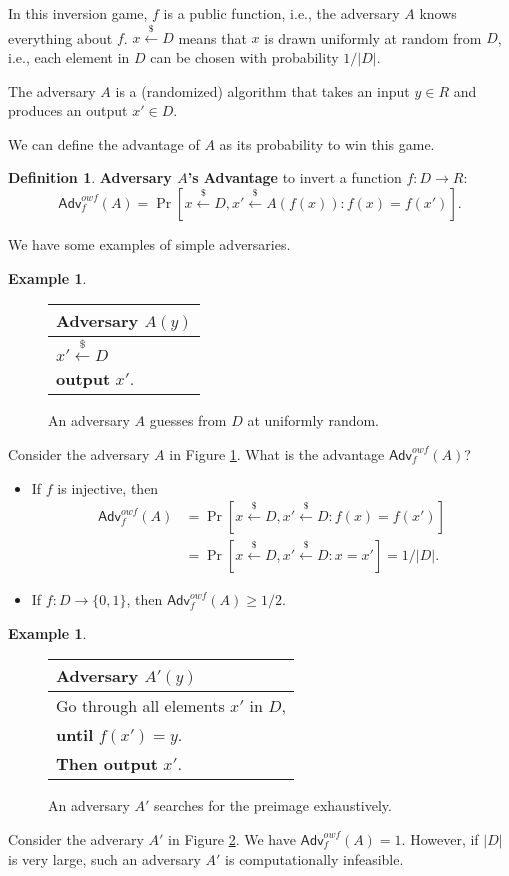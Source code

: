\documentclass[12pt]{article}
\newcommand{\bits}{\{0,1\}}
\newcommand{\getsr}{\stackrel{\$}{\gets}}
\newcommand{\Adv}{\textsf{Adv}}
\theoremstyle{definition}
\newtheorem{definition}[theorem]{Definition}
\newtheorem{example}[theorem]{Example}
\begin{document}
In this inversion game, $f$ is a public function, i.e., the adversary $A$ knows everything about $f$. $x \getsr D$ means that $x$ is drawn uniformly at random from $D$, i.e., each element in $D$ can be chosen with probability $1/|D|$.

The adversary $A$ is a (randomized) algorithm that takes an input $y\in R$ and produces an output $x'\in D$.

We can define the advantage of $A$ as its probability to win this game.
\begin{definition}
{\bf Adversary $A$'s Advantage} to invert a function $f : D \to R$:
$$\Adv_f^{owf}(A) = \Pr [x\getsr D, x'\getsr A(f(x)) : f(x)=f(x')].$$
\end{definition}

We have some examples of simple adversaries.
\begin{example}
\begin{figure}[!ht]
\centering
\begin{tabular}{l}
Adversary $A(y)$\\
\hline
$x' \getsr D$\\
{\bf output} $x'$.\\
\end{tabular}
\caption{An adversary $A$ guesses from $D$ at uniformly random.}
\label{fig:rg}
\end{figure}

Consider the adversary $A$ in Figure \ref{fig:rg}. What is the advantage $\Adv_f^{owf}(A)$?
\begin{itemize}
\item If $f$ is injective, then
$$
\begin{aligned}
\Adv_f^{owf}(A) &= \Pr [x\getsr D, x'\getsr D : f(x) = f(x')] \\
&= \Pr [x\getsr D, x'\getsr D : x = x'] = 1/|D|.
\end{aligned}$$

\item If $f : D \to \bits$, then $\Adv_f^{owf}(A) \geq 1/2$.
\end{itemize}
\end{example}

\begin{example}
\begin{figure}[!ht]
\centering
\begin{tabular}{l}
Adversary $A'(y)$\\
\hline
Go through all elements $x'$ in $D$, \\
{\bf until} $f(x')=y$. \\
{\bf Then output} $x'$.\\
\end{tabular}
\caption{An adversary $A'$ searches for the preimage exhaustively.}
\label{fig:bf}
\end{figure}

Consider the adverary $A'$ in Figure \ref{fig:bf}. We have $\Adv_f^{owf}(A) = 1$. However, if $|D|$ is very large, such an adversary $A'$ is computationally infeasible.
\end{example}
\end{document}
